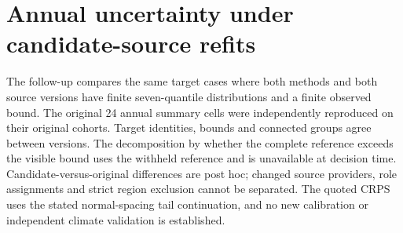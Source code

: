 \section{Annual uncertainty under candidate-source refits}
The follow-up compares the same target cases where both methods and both source versions have finite seven-quantile distributions and a finite observed bound. The original 24 annual summary cells were independently reproduced on their original cohorts. Target identities, bounds and connected groups agree between versions. The decomposition by whether the complete reference exceeds the visible bound uses the withheld reference and is unavailable at decision time. Candidate-versus-original differences are post hoc; changed source providers, role assignments and strict region exclusion cannot be separated. The quoted CRPS uses the stated normal-spacing tail continuation, and no new calibration or independent climate validation is established.
